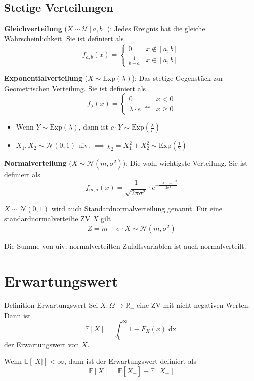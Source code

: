 \documentclass[a4paper,10pt]{article}
\def\R{\mathbb{R}}
\def\E{\mathbb{E}}
\begin{document}
\subsection{Stetige Verteilungen}
\textbf{Gleichverteilung} (\(X \sim \mathcal{U}[a,b]\)): Jedes Ereignis hat die gleiche Wahrscheinlichkeit. Sie ist definiert als
\[f_{a,b}(x) = \begin{cases}
		0             & x \notin [a,b] \\
		\frac{1}{b-a} & x \in [a,b]
	\end{cases}\]

\noindent \textbf{Exponentialverteilung} (\(X \sim \text{Exp}(\lambda)\)): Das stetige Gegenstück zur Geometrischen Verteilung. Sie ist definiert als
\[f_\lambda(x) = \begin{cases}
		0                            & x < 0    \\
		\lambda \cdot e^{-\lambda x} & x \geq 0
	\end{cases}\]
\begin{itemize}
	\item Wenn \(Y\sim \text{Exp}(\lambda)\), dann ist \(c \cdot Y \sim \text{Exp}(\frac{\lambda}{c})\)
	\item \(X_1, X_2 \sim \mathcal{N}(0,1)\) uiv. \(\implies \chi_2 = X_1^2 +X_2^2 \sim \text{Exp}(\frac{1}{2})\)
\end{itemize}

\noindent \textbf{Normalverteilung} (\(X \sim \mathcal{N}(m, \sigma^2)\)): Die wohl wichtigste Verteilung. Sie ist definiert als
\[f_{m, \sigma}(x) = \frac{1}{\sqrt{2 \pi \sigma^2}} \cdot e^{-\frac{(x-m)^2}{2 \sigma^2}}\]

\(X \sim \mathcal{N}(0,1)\) wird auch Standardnormalverteilung genannt. Für eine standardnormalverteilte ZV \(X\) gilt
\[Z = m +\sigma \cdot X \sim \mathcal{N}(m, \sigma^2)\]

Die Summe von uiv. normalverteilten Zufallsvariablen ist auch normalverteilt.

\section{Erwartungswert}
\begin{mainbox}{Definition Erwartungswert}
	Sei \(X: \Omega \mapsto \R_+\) eine ZV mit nicht-negativen Werten. Dann ist
	\[\E[X] = \int_0^\infty 1- F_X(x) \mathop{dx}\]
	der Erwartungswert von \(X\).
\end{mainbox}
Wenn \(\E[|X|] < \infty\), dann ist der Erwartungswert definiert als
\[\E[X] = \E[X_+] - \E[X_-]\]
\end{document}
